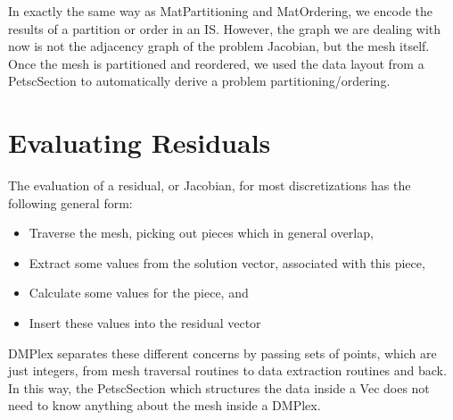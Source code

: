 {{{In exactly the same way as MatPartitioning and MatOrdering, we encode the results of a partition or order in an
IS. However, the graph we are dealing with now is not the adjacency graph of the problem Jacobian, but the mesh
itself. Once the mesh is partitioned and reordered, we used the data layout from a PetscSection to automatically derive
a problem partitioning/ordering.

\section{Evaluating Residuals} 

The evaluation of a residual, or Jacobian, for most discretizations has the following general form:
\begin{itemize}
  \item Traverse the mesh, picking out pieces which in general overlap,

  \item Extract some values from the solution vector, associated with this piece,

  \item Calculate some values for the piece, and

  \item Insert these values into the residual vector
\end{itemize}
DMPlex separates these different concerns by passing sets of points, which are just integers, from mesh traversal
routines to data extraction routines and back. In this way, the PetscSection which structures the data inside a Vec does
not need to know anything about the mesh inside a DMPlex.

}}}
